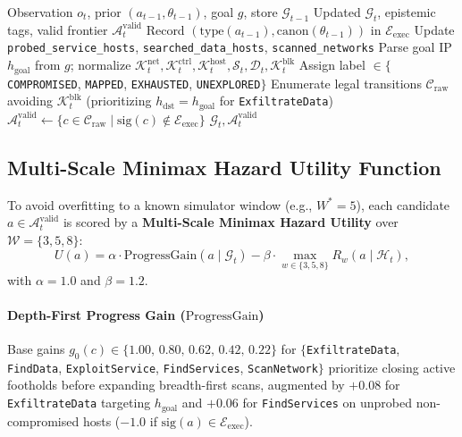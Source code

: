 \documentclass[a4paper,fleqn]{cas-dc}
\begin{document}
\begin{algorithm}[t]
\caption{Topological Belief Graph Update \& Frontier Enumeration}
\label{alg:belief_graph}
\begin{algorithmic}[1]
\Require Observation $o_t$, prior $(a_{t-1}, \theta_{t-1})$, goal $g$, store $\mathcal{G}_{t-1}$
\Ensure Updated $\mathcal{G}_t$, epistemic tags, valid frontier $\mathcal{A}^{\text{valid}}_t$
    \State Record $(\text{type}(a_{t-1}), \text{canon}(\theta_{t-1}))$ in $\mathcal{E}_{\text{exec}}$
    \State Update \texttt{probed\_service\_hosts}, \texttt{searched\_data\_hosts}, \texttt{scanned\_networks}
\EndIf
\State Parse goal IP $h_{\text{goal}}$ from $g$; normalize $\mathcal{K}^{\text{net}}_t, \mathcal{K}^{\text{ctrl}}_t, \mathcal{K}^{\text{host}}_t, \mathcal{S}_t, \mathcal{D}_t, \mathcal{K}^{\text{blk}}_t$
    \State Assign label $\in \{$\texttt{COMPROMISED}, \texttt{MAPPED}, \texttt{EXHAUSTED}, \texttt{UNEXPLORED}$\}$
\EndFor
\State Enumerate legal transitions $\mathcal{C}_{\text{raw}}$ avoiding $\mathcal{K}^{\text{blk}}_t$ (prioritizing $h_{\text{dst}} = h_{\text{goal}}$ for \texttt{ExfiltrateData})
\State $\mathcal{A}^{\text{valid}}_t \leftarrow \{c \in \mathcal{C}_{\text{raw}} \mid \text{sig}(c) \notin \mathcal{E}_{\text{exec}}\}$ 
\State \Return $\mathcal{G}_t, \mathcal{A}^{\text{valid}}_t$
\end{algorithmic}
\end{algorithm}

\subsection{Multi-Scale Minimax Hazard Utility Function}
To avoid overfitting to a known simulator window (e.g., $W^*=5$), each candidate $a \in \mathcal{A}^{\text{valid}}_t$ is scored by a \textbf{Multi-Scale Minimax Hazard Utility} over $\mathcal{W} = \{3, 5, 8\}$:
\begin{equation}
    U(a) = \alpha \cdot \mathrm{ProgressGain}(a \mid \mathcal{G}_t) - \beta \cdot \max_{w \in \{3, 5, 8\}} R_w(a \mid \mathcal{H}_t),
    \label{eq:minimax_utility}
\end{equation}
with $\alpha = 1.0$ and $\beta = 1.2$.

\paragraph{Depth-First Progress Gain ($\mathrm{ProgressGain}$)}
Base gains $g_0(c) \in \{1.00,\, 0.80,\, 0.62,\, 0.42,\, 0.22\}$ for $\{$\texttt{ExfiltrateData}, \texttt{FindData}, \texttt{ExploitService}, \texttt{FindServices}, \texttt{ScanNetwork}$\}$ prioritize closing active footholds before expanding breadth-first scans, augmented by $+0.08$ for \texttt{ExfiltrateData} targeting $h_{\text{goal}}$ and $+0.06$ for \texttt{FindServices} on unprobed non-compromised hosts ($-1.0$ if $\mathrm{sig}(a) \in \mathcal{E}_{\text{exec}}$).
\end{document}
